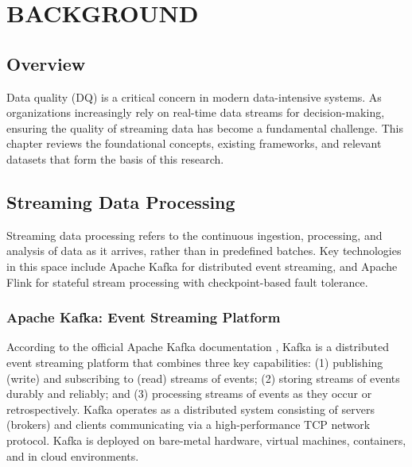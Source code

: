 \chapter{BACKGROUND}

\section{Overview}

Data quality (DQ) is a critical concern in modern data-intensive systems. As organizations increasingly rely on real-time data streams for decision-making, ensuring the quality of streaming data has become a fundamental challenge. This chapter reviews the foundational concepts, existing frameworks, and relevant datasets that form the basis of this research.

\section{Streaming Data Processing}

Streaming data processing refers to the continuous ingestion, processing, and analysis of data as it arrives, rather than in predefined batches. Key technologies in this space include Apache Kafka \citep{kafkaintro2024} for distributed event streaming, and Apache Flink \citep{flinkdocs2024} for stateful stream processing with checkpoint-based fault tolerance.

\subsection{Apache Kafka: Event Streaming Platform}

According to the official Apache Kafka documentation \citep{kafkaintro2024}, Kafka is a distributed event streaming platform that combines three key capabilities: (1) publishing (write) and subscribing to (read) streams of events; (2) storing streams of events durably and reliably; and (3) processing streams of events as they occur or retrospectively. Kafka operates as a distributed system consisting of servers (brokers) and clients communicating via a high-performance TCP network protocol. Kafka is deployed on bare-metal hardware, virtual machines, containers, and in cloud environments.

